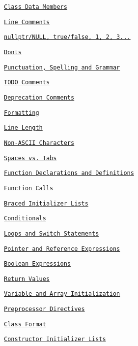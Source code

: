 \begin{DoxyItemize}
\begin{DoxyItemize}
\begin{DoxyItemize}
\item \href{#class-data-members-2}{\tt Class Data Members}
\item \href{#line-comments}{\tt Line Comments}
\item \href{#nullptrnull-truefalse-1-2-3}{\tt nullptr/\+N\+U\+LL, true/false, 1, 2, 3...}
\item \href{#donts}{\tt Don\textquotesingle{}ts}
\end{DoxyItemize}
\item \href{#punctuation-spelling-and-grammar}{\tt Punctuation, Spelling and Grammar}
\item \href{#todo-comments}{\tt T\+O\+DO Comments}
\item \href{#deprecation-comments}{\tt Deprecation Comments}
\end{DoxyItemize}
\item \href{#formatting}{\tt Formatting}
\begin{DoxyItemize}
\item \href{#line-length}{\tt Line Length}
\item \href{#non-ascii-characters}{\tt Non-\/\+A\+S\+C\+II Characters}
\item \href{#spaces-vs-tabs}{\tt Spaces vs. Tabs}
\item \href{#function-declarations-and-definitions}{\tt Function Declarations and Definitions}
\item \href{#function-calls}{\tt Function Calls}
\item \href{#braced-initializer-lists}{\tt Braced Initializer Lists}
\item \href{#conditionals}{\tt Conditionals}
\item \href{#loops-and-switch-statements}{\tt Loops and Switch Statements}
\item \href{#pointer-and-reference-expressions}{\tt Pointer and Reference Expressions}
\item \href{#boolean-expressions}{\tt Boolean Expressions}
\item \href{#return-values}{\tt Return Values}
\item \href{#variable-and-array-initialization}{\tt Variable and Array Initialization}
\item \href{#preprocessor-directives}{\tt Preprocessor Directives}
\item \href{#class-format}{\tt Class Format}
\item \href{#constructor-initializer-lists}{\tt Constructor Initializer Lists}

\end{DoxyItemize}
\end{DoxyItemize}
